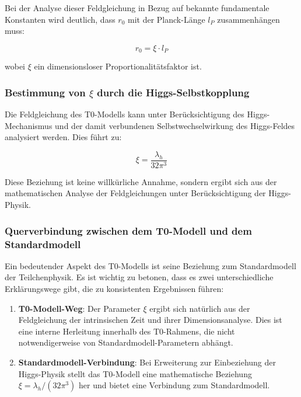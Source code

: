 \documentclass[12pt,a4paper]{article}
\begin{document}
	Bei der Analyse dieser Feldgleichung in Bezug auf bekannte fundamentale Konstanten wird deutlich, dass \(r_0\) mit der Planck-Länge \(l_P\) zusammenhängen muss:
	
	\begin{equation}
		r_0 = \xi \cdot l_P
	\end{equation}
	
	wobei \(\xi\) ein dimensionsloser Proportionalitätsfaktor ist.
	
	\subsubsection{Bestimmung von \(\xi\) durch die Higgs-Selbstkopplung}
	
	Die Feldgleichung des T0-Modells kann unter Berücksichtigung des Higgs-Mechanismus und der damit verbundenen Selbstwechselwirkung des Higgs-Feldes analysiert werden. Dies führt zu:
	
	\begin{equation}
		\xi = \frac{\lambda_h}{32\pi^3}
	\end{equation}
	
	Diese Beziehung ist keine willkürliche Annahme, sondern ergibt sich aus der mathematischen Analyse der Feldgleichungen unter Berücksichtigung der Higgs-Physik.
	
	\subsubsection{Querverbindung zwischen dem T0-Modell und dem Standardmodell}
	
	Ein bedeutender Aspekt des T0-Modells ist seine Beziehung zum Standardmodell der Teilchenphysik. Es ist wichtig zu betonen, dass es zwei unterschiedliche Erklärungswege gibt, die zu konsistenten Ergebnissen führen:
	
	\begin{enumerate}
		\item \textbf{T0-Modell-Weg}: Der Parameter \(\xi\) ergibt sich natürlich aus der Feldgleichung der intrinsischen Zeit und ihrer Dimensionsanalyse. Dies ist eine interne Herleitung innerhalb des T0-Rahmens, die nicht notwendigerweise von Standardmodell-Parametern abhängt.
		
		\item \textbf{Standardmodell-Verbindung}: Bei Erweiterung zur Einbeziehung der Higgs-Physik stellt das T0-Modell eine mathematische Beziehung \(\xi = \lambda_h/(32\pi^3)\) her und bietet eine Verbindung zum Standardmodell.
	\end{enumerate}
	
\end{document}
